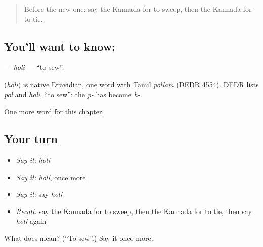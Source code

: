 \label{lesson:KA-C150-holi}



\begin{quote}
Before the new one: say the Kannada for to sweep, then the Kannada for to tie.
\end{quote}

\subsection*{You'll want to know: }
\textbf{} — \emph{holi} — \textquotedblleft{}to sew\textquotedblright{}.

\begin{cousinweb}
\textbf{} (\emph{holi}) is native Dravidian, one word with Tamil \emph{pollam} (DEDR 4554). DEDR lists \emph{pol} and \emph{holi}, \textquotedblleft{}to sew\textquotedblright{}: the \emph{p-} has become \emph{h-}.
\end{cousinweb}

\begin{grammarlens}[title={What you've built}]
One more word for this chapter.
\end{grammarlens}

\subsection*{Your turn}
\begin{itemize}
\raggedright
  \item \emph{Say it:} \emph{holi}
  \item \emph{Say it:} \emph{holi}, once more
  \item \emph{Say it:} say \emph{holi}
  \item \emph{Recall:} say the Kannada for to sweep, then the Kannada for to tie, then say \emph{holi} again
\end{itemize}

\begin{tcolorbox}[breakable,colback=teal!4,colframe=teal!35!black,title={Before you move on}]
What does  mean? (\textquotedblleft{}To sew\textquotedblright{}.) Say it once more.
\end{tcolorbox}
